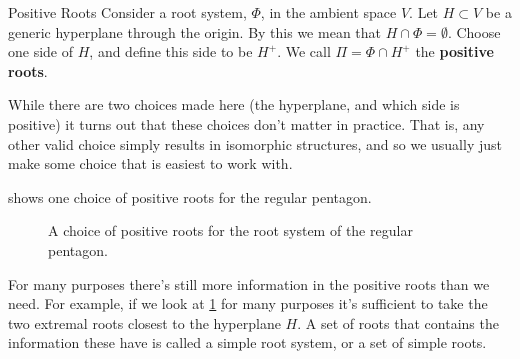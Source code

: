 \documentclass[fleqn, a4paper, openany]{memoir}
\newcommand{\define}[1]{\textbf{#1}}
\begin{document}
    \begin{dfn}{Positive Roots}{}
        Consider a root system, \(\Phi\), in the ambient space \(V\).
        Let \(H \subset V\) be a generic hyperplane through the origin.
        By this we mean that \(H \cap \Phi = \emptyset\).
        Choose one side of \(H\), and define this side to be \(H^+\).
        We call \(\Pi = \Phi \cap H^+\) the \define{positive roots}.
    \end{dfn}
    
    While there are two choices made here (the hyperplane, and which side is positive) it turns out that these choices don't matter in practice.
    That is, any other valid choice simply results in isomorphic structures, and so we usually just make some choice that is easiest to work with.
    
     shows one choice of positive roots for the regular pentagon.
    
    \begin{figure}
        \centering
        \caption{A choice of positive roots for the root system of the regular pentagon.}
        \label{fig:regular pentagon positive roots}
    \end{figure}
    
    For many purposes there's still more information in the positive roots than we need.
    For example, if we look at \cref{fig:regular pentagon positive roots} for many purposes it's sufficient to take the two extremal roots closest to the hyperplane \(H\).
    A set of roots that contains the information these have is called a simple root system, or a set of simple roots.
    
\end{document}
